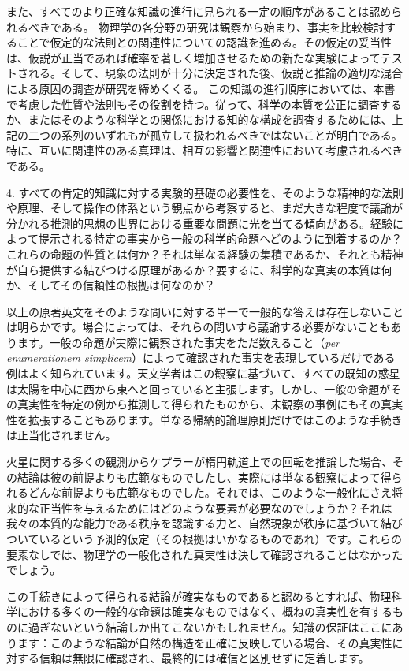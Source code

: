 \documentclass[a4paper,11pt,openany]{ltjsbook}
\begin{document}
また、すべてのより正確な知識の進行に見られる一定の順序があることは認められるべきである。
物理学の各分野の研究は観察から始まり、事実を比較検討することで仮定的な法則との関連性についての認識を進める。その仮定の妥当性は、仮説が正当であれば確率を著しく増加させるための新たな実験によってテストされる。そして、現象の法則が十分に決定された後、仮説と推論の適切な混合による原因の調査が研究を締めくくる。
この知識の進行順序においては、本書で考慮した性質や法則もその役割を持つ。従って、科学の本質を公正に調査するか、またはそのような科学との関係における知的な構成を調査するためには、上記の二つの系列のいずれもが孤立して扱われるべきではないことが明白である。
特に、互いに関連性のある真理は、相互の影響と関連性において考慮されるべきである。

4. すべての肯定的知識に対する実験的基礎の必要性を、そのような精神的な法則や原理、そして操作の体系という観点から考察すると、まだ大きな程度で議論が分かれる推測的思想の世界における重要な問題に光を当てる傾向がある。経験によって提示される特定の事実から一般の科学的命題へどのように到着するのか？これらの命題の性質とは何か？それは単なる経験の集積であるか、それとも精神が自ら提供する結びつける原理があるか？要するに、科学的な真実の本質は何か、そしてその信頼性の根拠は何なのか？

以上の原著英文をそのような問いに対する単一で一般的な答えは存在しないことは明らかです。場合によっては、それらの問いすら議論する必要がないこともあります。一般の命題が実際に観察された事実をただ数えること（\textit{per enumerationem simplicem}）によって確認された事実を表現しているだけである例はよく知られています。天文学者はこの観察に基づいて、すべての既知の惑星は太陽を中心に西から東へと回っていると主張します。しかし、一般の命題がその真実性を特定の例から推測して得られたものから、未観察の事例にもその真実性を拡張することもあります。単なる帰納的論理原則だけではこのような手続きは正当化されません。

火星に関する多くの観測からケプラーが楕円軌道上での回転を推論した場合、その結論は彼の前提よりも広範なものでしたし、実際には単なる観察によって得られるどんな前提よりも広範なものでした。それでは、このような一般化にさえ将来的な正当性を与えるためにはどのような要素が必要なのでしょうか？それは我々の本質的な能力である秩序を認識する力と、自然現象が秩序に基づいて結びついているという予測的仮定（その根拠はいかなるものであれ）です。これらの要素なしでは、物理学の一般化された真実性は決して確認されることはなかったでしょう。

この手続きによって得られる結論が確実なものであると認めるとすれば、物理科学における多くの一般的な命題は確実なものではなく、概ねの真実性を有するものに過ぎないという結論しか出てこないかもしれません。知識の保証はここにあります：このような結論が自然の構造を正確に反映している場合、その真実性に対する信頼は無限に確認され、最終的には確信と区別せずに定着します。
\end{document}
